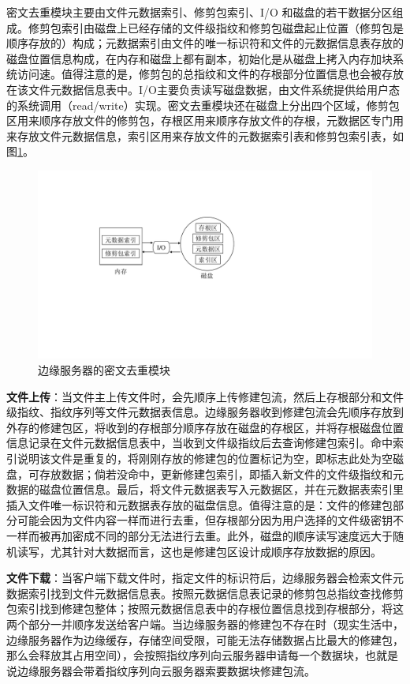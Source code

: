 \documentclass[promaster]{thesis-uestc}
\begin{document}
密文去重模块主要由文件元数据索引、修剪包索引、I/O 和磁盘的若干数据分区组成。修剪包索引由磁盘上已经存储的文件级指纹和修剪包磁盘起止位置（修剪包是顺序存放的）构成；元数据索引由文件的唯一标识符和文件的元数据信息表存放的磁盘位置信息构成，在内存和磁盘上都有副本，初始化是从磁盘上拷入内存加块系统访问速。值得注意的是，修剪包的总指纹和文件的存根部分位置信息也会被存放在该文件元数据信息表中。I/O主要负责读写磁盘数据，由文件系统提供给用户态的系统调用（read/write）实现。密文去重模块还在磁盘上分出四个区域，修剪包区用来顺序存放文件的修剪包，存根区用来顺序存放文件的存根，元数据区专门用来存放文件元数据信息，索引区用来存放文件的元数据索引表和修剪包索引表，如图\ref{边缘服务器的密文去重模块}。
\begin{figure}[htbp]
    \centering
    \includegraphics[width = 0.7\linewidth]{pic/边缘服务器的密文重删模块.pdf}
    \caption{边缘服务器的密文去重模块}
    \label{边缘服务器的密文去重模块}
\end{figure}


\textbf{文件上传}：当文件主上传文件时，会先顺序上传修建包流，然后上存根部分和文件级指纹、指纹序列等文件元数据表信息。边缘服务器收到修建包流会先顺序存放到外存的修建包区，将收到的存根部分顺序存放在磁盘的存根区，并将存根磁盘位置信息记录在文件元数据信息表中，当收到文件级指纹后去查询修建包索引。命中索引说明该文件是重复的，将刚刚存放的修建包的位置标记为空，即标志此处为空磁盘，可存放数据；倘若没命中，更新修建包索引，即插入新文件的文件级指纹和元数据的磁盘位置信息。最后，将文件元数据表写入元数据区，并在元数据表索引里插入文件唯一标识符和元数据表存放的磁盘信息。值得注意的是：文件的修建包部分可能会因为文件内容一样而进行去重，但存根部分因为用户选择的文件级密钥不一样而被再加密成不同的部分无法进行去重。此外，磁盘的顺序读写速度远大于随机读写，尤其针对大数据而言，这也是修建包区设计成顺序存放数据的原因。

\textbf{文件下载}：当客户端下载文件时，指定文件的标识符后，边缘服务器会检索文件元数据索引找到文件元数据信息表。按照元数据信息表记录的修剪包总指纹查找修剪包索引找到修建包整体；按照元数据信息表中的存根位置信息找到存根部分，将这两个部分一并顺序发送给客户端。当边缘服务器的修建包不存在时（现实生活中，边缘服务器作为边缘缓存，存储空间受限，可能无法存储数据占比最大的修建包，那么会释放其占用空间），会按照指纹序列向云服务器申请每一个数据块，也就是说边缘服务器会带着指纹序列向云服务器索要数据块修建包流。
\end{document}
